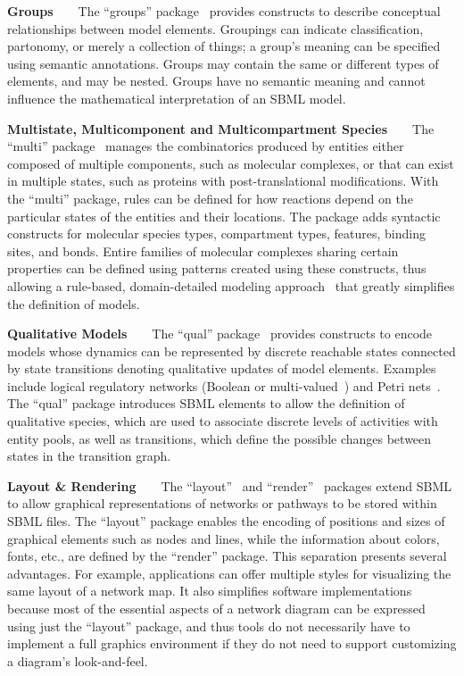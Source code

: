 \documentclass[]{draft-sbml-paper}
\begin{document}
\textbf{Groups}~~~~The ``groups'' package~\citep{hucka2016sbml} provides constructs to describe conceptual relationships between model elements. Groupings can indicate classification, partonomy, or merely a collection of things; a group's meaning can be specified using semantic annotations.  Groups may contain the same or different types of elements, and may be nested. Groups have no semantic meaning and cannot influence the mathematical interpretation of an SBML model.

\textbf{Multistate, Multicomponent and Multicompartment Species}~~~~The ``multi'' package~\citep{zhang2018multi} manages the combinatorics produced by entities either composed of multiple components, such as molecular complexes, or that can exist in multiple states, such as proteins with post-translational modifications. With the ``multi'' package, rules can be defined for how reactions depend on the particular states of the entities and their locations. The package adds syntactic constructs for molecular species types, compartment types, features, binding sites, and bonds.  Entire families of molecular complexes sharing certain properties can be defined using patterns created using these constructs, thus allowing a rule-based, domain-detailed modeling approach~\citep{Blinov2004, Stefan2014multistate, Chylek2014rulebased} that greatly simplifies the definition of models.

\textbf{Qualitative Models}~~~~The ``qual'' package~\citep{Chaouiya2015sbml} provides constructs to encode models whose dynamics can be represented by discrete reachable states connected by state transitions denoting qualitative updates of model elements. Examples include logical regulatory networks (Boolean or multi-valued~\citep{abou2016logical}) and Petri nets~\citep{chaouiya2007petri}. The ``qual'' package introduces SBML elements to allow the definition of qualitative species, which are used to associate discrete levels of activities with entity pools, as well as transitions, which define the possible changes between states in the transition graph.

\textbf{Layout \& Rendering}~~~~The ``layout''~\citep{Gauges2015} and ``render''~\citep{Bergmann2017} packages extend SBML to allow graphical representations of networks or pathways to be stored within SBML files. The ``layout'' package enables the encoding of positions and sizes of graphical elements such as nodes and lines, while the information about colors, fonts, etc., are defined by the ``render'' package. This separation presents several advantages. For example, applications can offer multiple styles for visualizing the same layout of a network map. It also simplifies software implementations because most of the essential aspects of a network diagram can be expressed using just the ``layout'' package, and thus tools do not necessarily have to implement a full graphics environment if they do not need to support customizing a diagram's look-and-feel.
\end{document}
